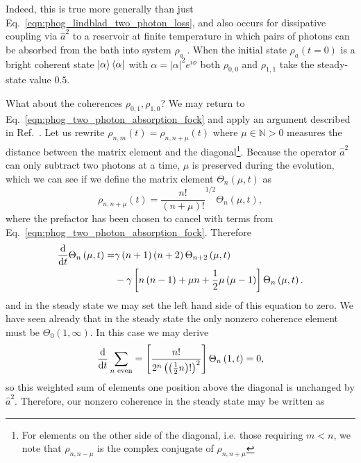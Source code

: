 \noindent Indeed, this is true more generally than just Eq.~\ref{eqn:phog_lindblad_two_photon_loss}, and also occurs for dissipative coupling via $\hat{a}^2$ to a reservoir at finite temperature in which pairs of photons can be absorbed from the bath into system $\rho_a$ \cite{Simaan1975}. When the initial state $\rho_a\left(t=0\right)$ is a bright coherent state $\ket{\alpha}\bra{\alpha}$ with $\alpha = \left|\alpha\right|^2 e^{i \phi}$ both $\rho_{0, 0}$ and $\rho_{1,1}$ take the steady-state value $0.5$.

What about the coherences $\rho_{0,1}, \rho_{1, 0}$? We may return to Eq.~\ref{eqn:phog_two_photon_absorption_fock} and apply an argument described in Ref.~\cite{Simaan1978}. Let us rewrite $\rho_{n, m} \left(t\right) = \rho_{n, n+\mu}\left(t\right)$ where $\mu \in \mathbb{N}>0$ measures the distance between the matrix element and the diagonal\footnote{For elements on the other side of the diagonal, i.e. those requiring $m < n$, we note that $\rho_{n, n-\mu}$ is the complex conjugate of $\rho_{n, n+\mu}$}. Because the operator $\hat{a}^2$ can only subtract two photons at a time, $\mu$ is preserved during the evolution, which we can see if we define the matrix element $\Theta_n\left(\mu, t\right)$ as
\begin{equation}
\rho_{n, n+\mu}\left(t\right) = \frac{n!}{\left(n + \mu\right)!}^{1/2}\Theta_n\left(\mu, t\right),
\end{equation}
where the prefactor has been chosen to cancel with terms from Eq.~\ref{eqn:phog_two_photon_absorption_fock}. Therefore
\begin{align}
\frac{\mathrm{d}}{\mathrm{d}t} \Theta_n\left(\mu, t\right) = &\gamma\left(n+1\right)\left(n+2\right)\Theta_{n+2}\left(\mu, t\right) \notag \\ &-\gamma\left[n \left(n-1\right) + \mu n + \frac{1}{2}\mu \left(\mu - 1\right)\right] \Theta_n\left(\mu, t\right).
\end{align}
and in the steady state we may set the left hand side of this equation to zero. We have seen already that in the steady state the only nonzero coherence element must be $\Theta_0\left(1, \infty\right)$. In this case we may derive
\begin{equation}
\frac{\mathrm{d}}{\mathrm{d}t} \sum_{n \text{ even}} = \left[\frac{n!}{2^n \left(\left(\frac{1}{2}n\right)!\right)^2} \right] \Theta_n\left(1, t\right) = 0,
\end{equation}
so this weighted sum of elements one position above the diagonal is unchanged by $\hat{a}^2$. Therefore, our nonzero coherence in the steady state may be written as
